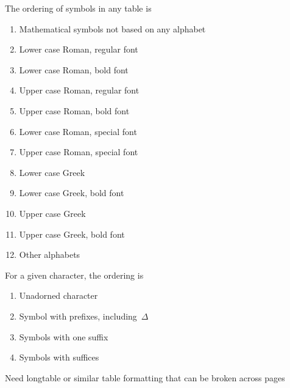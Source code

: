 The ordering of symbols in any table is 
\begin{enumerate}
\item Mathematical symbols not based on any alphabet
\item Lower case Roman, regular font
\item Lower case Roman, bold font
\item Upper case Roman, regular font
\item Upper case Roman, bold font
\item Lower case Roman, special font
\item Upper case Roman, special font
\item Lower case Greek
\item Lower case Greek, bold font
\item Upper case Greek
\item Upper case Greek, bold font
\item Other alphabets
\end{enumerate}
For a given character, the ordering is
\begin{enumerate}
\item Unadorned character
\item Symbol with prefixes, including~$\Delta$
\item Symbols with one suffix
\item Symbols with suffices 
\end{enumerate}


Need longtable or similar table formatting that can be broken across pages
